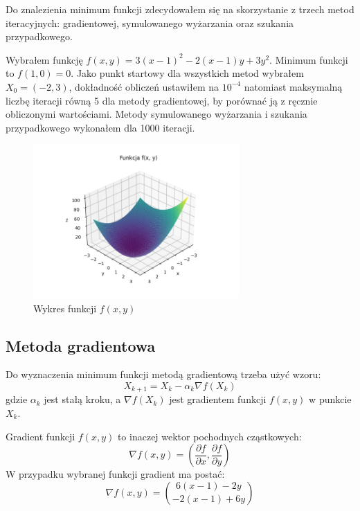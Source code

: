\documentclass{article}
\begin{document}
Do znalezienia minimum funkcji zdecydowałem się na skorzystanie z
trzech metod iteracyjnych: gradientowej, symulowanego wyżarzania
oraz szukania przypadkowego.

Wybrałem funkcję $f(x, y) = 3(x-1)^2-2(x-1)y+3y^2$. Minimum funkcji to $f(1, 0) = 0$.
Jako punkt startowy dla wszystkich metod wybrałem $X_0 = (-2, 3)$, dokładność
obliczeń ustawiłem na $10^{-4}$ natomiast maksymalną liczbę iteracji równą 5 dla
metody gradientowej, by porównać ją z ręcznie obliczonymi wartościami. Metody
symulowanego wyżarzania i szukania przypadkowego wykonałem dla 1000 iteracji.

\begin{figure}[H]
    \centering
    \includegraphics[width=0.7\textwidth]{Zad3/function.png}
    \caption{Wykres funkcji $f(x, y)$}
\end{figure}

\subsection{Metoda gradientowa}

Do wyznaczenia minimum funkcji metodą gradientową trzeba użyć
wzoru:
\begin{equation}
X_{k+1} = X_k - \alpha_k \nabla f(X_k)
\end{equation}
gdzie $\alpha_k$ jest stałą kroku, 
a $\nabla f(X_k)$ jest gradientem
funkcji $f(x, y)$ w punkcie $X_k$.

Gradient funkcji $f(x, y)$ to inaczej wektor pochodnych
cząstkowych:
\begin{equation}
\nabla f(x, y) = \left( \frac{\partial f}{\partial x}, \frac{\partial f}{\partial y} \right)
\end{equation}
W przypadku wybranej funkcji gradient ma postać:
\begin{equation}
\nabla f(x, y) = {6(x - 1)-2y \choose -2(x-1)+6y}
\end{equation}
\end{document}

